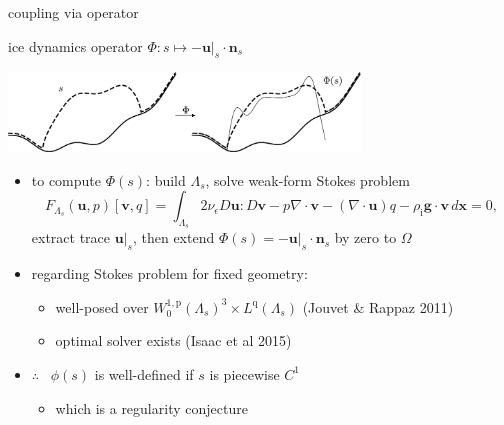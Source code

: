 \documentclass[usepdftitle=false,usenames,dvipsnames]{beamer}
\newcommand{\eps}{\epsilon}
\newcommand{\Div}{\nabla\cdot}
\newcommand{\bg}{\mathbf{g}}
\newcommand{\bn}{\mathbf{n}}
\newcommand{\bu}{\mathbf{u}}
\newcommand{\bv}{\mathbf{v}}
\newcommand{\bx}{\mathbf{x}}
\newcommand{\rhoi}{\rho_{\text{i}}}
\newcommand{\pp}{{\text{p}}}
\newcommand{\qq}{{\text{q}}}
\newcommand{\bus}{\bu|_s}
\begin{document}
\begin{frame}{coupling via operator}

\begin{block}{ice dynamics operator}
$\Phi : s \mapsto - \bus \cdot \bn_s$

\vspace{-3mm}

\hfill \includegraphics[width=0.7\textwidth]{figs/idoaction.png}
\end{block}

\begin{itemize}
\item to compute $\Phi(s)$: build $\Lambda_s$, solve weak-form Stokes problem
    $$F_{\Lambda_s}(\bu,p)[\bv,q] = \int_{\Lambda_s} 2 \nu_\eps D\bu : D\bv - p \Div\bv - (\Div\bu) q - \rhoi \bg \cdot \bv\,d\bx = 0,$$
extract trace $\bus$, then extend $\Phi(s) = -\bus \cdot \bn_s$ by zero to $\Omega$
\item regarding Stokes problem for fixed geometry:
    \begin{itemize}
    \item well-posed over $W_0^{1,\pp}(\Lambda_s)^3 \times L^\qq(\Lambda_s)$ (Jouvet \& Rappaz 2011)
    \item optimal solver exists (Isaac et al 2015)
    \end{itemize}
\item $\therefore$ \, $\phi(s)$ is well-defined if $s$ is piecewise $C^1$
    \begin{itemize}
    \item which is a regularity conjecture
    \end{itemize}
\end{itemize}

\end{frame}
\end{document}
